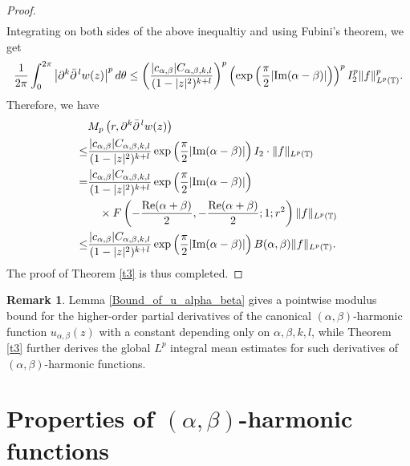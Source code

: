 \documentclass[11pt, reqno]{amsart}
\theoremstyle{definition}
\numberwithin{equation}{section}
\newtheorem{rem}{Remark}
\theoremstyle{remark}
\numberwithin{equation}{section}
\begin{document}
\begin{proof}
\begin{align*}
		\end{align*}
		Integrating on both sides of the above inequaltiy and using Fubini's theorem, we get
		\begin{eqnarray*}
			\frac{1}{2\pi} \int_0^{2\pi}\left| \partial^{k} \bar{\partial}^{\,l} w(z) \right|^p d\theta\leq \left(\frac{|c_{\alpha,\beta}|C_{\alpha,\beta,k,l}}{(1-|z|^2)^{k+l}}\right)^p \left(\exp\left(\frac{\pi}{2}|\text{\rm Im}(\alpha-\beta)|\right)\right)^pI_2^p\|f\|^p_{L^p(\mathbb{T})}.
		\end{eqnarray*}
		Therefore, we have
		\begin{align*}
        \begin{split}
			&M_p\left(r, \partial^{k} \bar{\partial}^{\,l} w(z)\right)\\\leq& \frac{|c_{\alpha,\beta}|C_{\alpha,\beta,k,l}}{(1-|z|^2)^{k+l}}\exp\left(\frac{\pi}{2}|\text{\rm Im}(\alpha-\beta)|\right)I_2\cdot\|f\|_{L^p(\mathbb{T})}\\=&\frac{|c_{\alpha,\beta}|C_{\alpha,\beta,k,l}}{(1-|z|^2)^{k+l}}\exp\left(\frac{\pi}{2}|\text{\rm Im}(\alpha-\beta)|\right)
            \\&\quad\times F\left(-\frac{\mbox{Re}(\alpha+\beta)}{2},-\frac{\mbox{Re}(\alpha+\beta)}{2};1;r^2\right)\|f\|_{L^p(\mathbb{T})}\\\leq& \frac{|c_{\alpha,\beta}|C_{\alpha,\beta,k,l}}{(1-|z|^2)^{k+l}}\exp\left(\frac{\pi}{2}|\text{\rm Im}(\alpha-\beta)|\right)B(\alpha,\beta)\|f\|_{L^p(\mathbb{T})}.
            \end{split}
		\end{align*}
    The proof of Theorem \ref{t3} is thus completed.
	\end{proof}
    \begin{rem}
Lemma \ref{Bound_of_u_alpha_beta} gives a pointwise modulus bound for the higher-order partial derivatives of the canonical $(\alpha, \beta)$-harmonic function $u_{\alpha, \beta}(z)$ with a constant depending only on $\alpha, \beta, k, l$, while Theorem \ref{t3} further derives the global $L^p$ integral mean estimates for such derivatives of $(\alpha, \beta)$-harmonic functions.
    \end{rem}
	
	
	
	\section{Properties of $(\alpha,\beta)$-harmonic functions}
\end{document}

